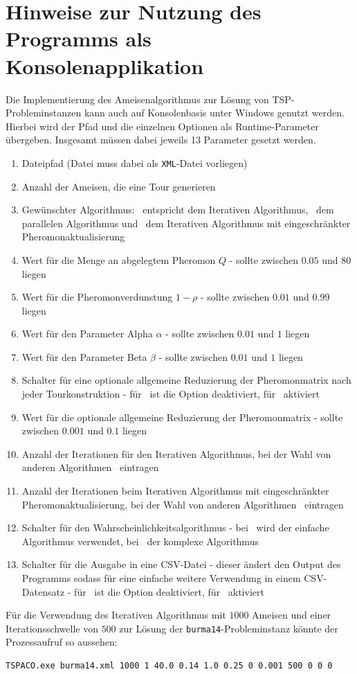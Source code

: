 \documentclass[doktyp=barbeit, sprache=german]{TUBAFarbeiten}
\begin{document}
\section{Hinweise zur Nutzung des Programms als Konsolenapplikation}
Die Implementierung des Ameisenalgorithmus zur Lösung von TSP-Probleminstanzen kann auch auf Konsolenbasis unter Windows genutzt werden. Hierbei wird der Pfad und die einzelnen Optionen als Runtime-Parameter übergeben. Insgesamt müssen dabei jeweils 13 Parameter gesetzt werden.
\begin{enumerate}
\item Dateipfad (Datei muss dabei als \texttt{XML}-Datei vorliegen)
\item Anzahl der Ameisen, die eine Tour generieren
\item Gewünschter Algorithmus: \grqq\, entspricht dem Iterativen Algorithmus, \grqq\, dem parallelen Algorithmus und \grqq\, dem Iterativen Algorithmus mit eingeschränkter Pheromonaktualisierung
\item Wert für die Menge an abgelegtem Pheromon $Q$ - sollte zwischen $0.05$ und $80$ liegen
\item Wert für die Pheromonverdunstung $1 - \rho$ - sollte zwischen $0.01$ und $0.99$ liegen
\item Wert für den Parameter Alpha $\alpha$ - sollte zwischen $0.01$ und $1$ liegen
\item Wert für den Parameter Beta $\beta$ - sollte zwischen $0.01$ und $1$ liegen
\item Schalter für eine optionale allgemeine Reduzierung der Pheromonmatrix nach jeder Tourkonstruktion - für \grqq\, ist die Option deaktiviert, für \grqq\, aktiviert
\item Wert für die optionale allgemeine Reduzierung der Pheromonmatrix - sollte zwischen $0.001$ und $0.1$ liegen
\item Anzahl der Iterationen für den Iterativen Algorithmus, bei der Wahl von anderen Algorithmen \grqq\, eintragen
\item Anzahl der Iterationen beim Iterativen Algorithmus mit eingeschränkter Pheromonaktualisierung, bei der Wahl von anderen Algorithmen \grqq\, eintragen
\item Schalter für den Wahrscheinlichkeitsalgorithmus - bei \grqq\, wird der einfache Algorithmus verwendet, bei \grqq\, der komplexe Algorithmus
\item Schalter für die Ausgabe in eine CSV-Datei - dieser ändert den Output des Programms sodass für eine einfache weitere Verwendung in einem CSV-Datensatz - für \grqq\, ist die Option deaktiviert, für \grqq\, aktiviert
\end{enumerate}
Für die Verwendung des Iterativen Algorithmus mit $1000$ Ameisen und einer Iterationsschwelle von $500$ zur Lösung der \texttt{burma14}-Probleminstanz könnte der Prozessaufruf so aussehen:
\begin{lstlisting}
TSPACO.exe burma14.xml 1000 1 40.0 0.14 1.0 0.25 0 0.001 500 0 0 0
\end{lstlisting}

\newpage
{}
\end{document}
